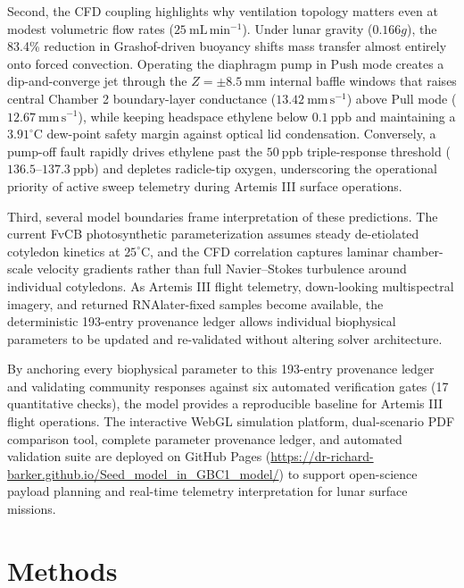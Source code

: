 \documentclass[10pt,twocolumn,twoside]{article}
\begin{document}
Second, the CFD coupling highlights why ventilation topology matters even at modest volumetric flow rates ($25\ \mathrm{mL\,min^{-1}}$). Under lunar gravity ($0.166g$), the 83.4\% reduction in Grashof-driven buoyancy shifts mass transfer almost entirely onto forced convection. Operating the diaphragm pump in Push mode creates a dip-and-converge jet through the $Z = \pm 8.5\ \mathrm{mm}$ internal baffle windows that raises central Chamber 2 boundary-layer conductance ($13.42\ \mathrm{mm\,s^{-1}}$) above Pull mode ($12.67\ \mathrm{mm\,s^{-1}}$), while keeping headspace ethylene below $0.1\ \mathrm{ppb}$ and maintaining a $3.91^\circ\mathrm{C}$ dew-point safety margin against optical lid condensation. Conversely, a pump-off fault rapidly drives ethylene past the $50\ \mathrm{ppb}$ triple-response threshold ($136.5\text{--}137.3\ \mathrm{ppb}$) and depletes radicle-tip oxygen, underscoring the operational priority of active sweep telemetry during Artemis III surface operations.

Third, several model boundaries frame interpretation of these predictions. The current FvCB photosynthetic parameterization assumes steady de-etiolated cotyledon kinetics at $25^\circ\mathrm{C}$, and the CFD correlation captures laminar chamber-scale velocity gradients rather than full Navier--Stokes turbulence around individual cotyledons. As Artemis III flight telemetry, down-looking multispectral imagery, and returned RNAlater-fixed samples become available, the deterministic 193-entry provenance ledger allows individual biophysical parameters to be updated and re-validated without altering solver architecture.

By anchoring every biophysical parameter to this 193-entry provenance ledger and validating community responses against six automated verification gates (17 quantitative checks), the model provides a reproducible baseline for Artemis III flight operations. The interactive WebGL simulation platform, dual-scenario PDF comparison tool, complete parameter provenance ledger, and automated validation suite are deployed on GitHub Pages (\url{https://dr-richard-barker.github.io/Seed_model_in_GBC1_model/}) to support open-science payload planning and real-time telemetry interpretation for lunar surface missions.

\section*{Methods}
\end{document}
